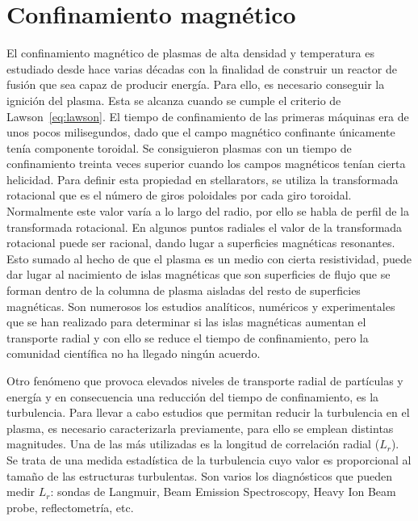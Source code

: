 \section{Confinamiento magnético}\label{sec:confinement}
El confinamiento magnético de plasmas de alta densidad y temperatura es estudiado
desde hace varias décadas con la finalidad de construir un reactor de fusión que sea capaz
de producir energía. Para ello, es necesario conseguir la ignición del plasma. Esta se alcanza
cuando se cumple el criterio de Lawson~\eqref{eq:lawson}.
El tiempo de confinamiento de las primeras máquinas era de unos pocos milisegundos, dado
que el campo magnético confinante únicamente tenía componente toroidal. Se consiguieron
plasmas con un tiempo de confinamiento treinta veces superior cuando los campos magnéticos
tenían cierta helicidad. Para definir esta propiedad en stellarators, se utiliza la transformada
rotacional que es el número de giros poloidales por cada giro toroidal. Normalmente este
valor varía a lo largo del radio, por ello se habla de perfil de la transformada rotacional. En
algunos puntos radiales el valor de la transformada rotacional puede ser racional, dando lugar
a superficies magnéticas resonantes. Esto sumado al hecho de que el plasma es un medio con
cierta resistividad, puede dar lugar al nacimiento de islas magnéticas que son superficies de
flujo que se forman dentro de la columna de plasma aisladas del resto de superficies magnéticas.
Son numerosos los estudios analíticos, numéricos y experimentales que se han realizado
para determinar si las islas magnéticas aumentan el transporte radial y con ello se reduce el
tiempo de confinamiento, pero la comunidad científica no ha llegado ningún acuerdo.\par
Otro fenómeno que provoca elevados niveles de transporte radial de partículas y energía
y en consecuencia una reducción del tiempo de confinamiento, es la turbulencia. Para llevar a
cabo estudios que permitan reducir la turbulencia en el plasma, es necesario caracterizarla
previamente, para ello se emplean distintas magnitudes. Una de las más utilizadas es la longitud
de correlación radial ($L_r$). Se trata de una medida estadística de la turbulencia cuyo
valor es proporcional al tamaño de las estructuras turbulentas.
Son varios los diagnósticos que pueden medir $L_r$: sondas de Langmuir, Beam Emission Spectroscopy,
Heavy Ion Beam probe, reflectometría, etc.
